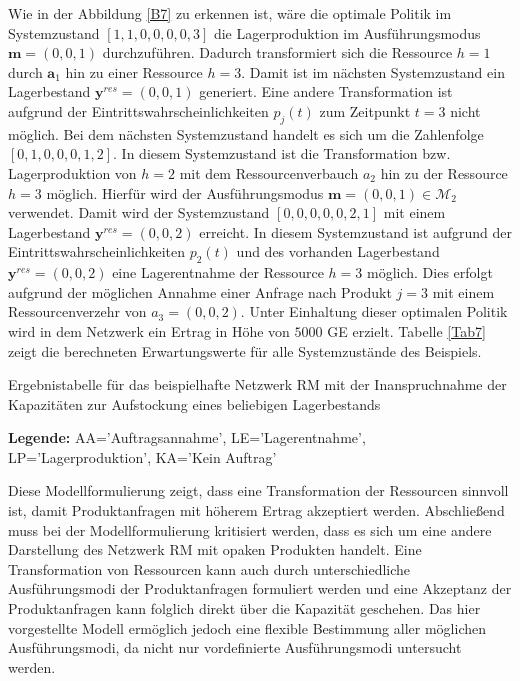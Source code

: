 Wie in der Abbildung \ref{B7} zu erkennen ist, wäre die optimale Politik im Systemzustand $[1,1,0,0,0,0,3]$ die Lagerproduktion im Ausführungsmodus $\textbf{m}=(0,0,1)$ durchzuführen. Dadurch transformiert sich die Ressource $h=1$ durch $\textbf{a}_{1}$ hin zu einer Ressource $h=3$. Damit ist im nächsten Systemzustand ein Lagerbestand $\textbf{y}^{res}=(0,0,1)$ generiert. Eine andere Transformation ist aufgrund der Eintrittswahrscheinlichkeiten $p_{j}(t)$ zum Zeitpunkt $t=3$ nicht möglich. Bei dem nächsten Systemzustand handelt es sich um die Zahlenfolge $[0,1,0,0,0,1,2]$. In diesem Systemzustand ist die Transformation bzw. Lagerproduktion von $h=2$ mit dem Ressourcenverbauch $a_{2}$ hin zu der Ressource $h=3$ möglich. Hierfür wird der Ausführungsmodus $\textbf{m}=(0,0,1)\in\mathcal{M}_2$ verwendet. Damit wird der Systemzustand $[0,0,0,0,0,2,1]$ mit einem Lagerbestand $\textbf{y}^{res}=(0,0,2)$ erreicht. In diesem Systemzustand ist aufgrund der Eintrittswahrscheinlichkeiten $p_2(t)$ und des vorhanden Lagerbestand $\textbf{y}^{res}=(0,0,2)$ eine Lagerentnahme der Ressource $h=3$ möglich. Dies erfolgt aufgrund der möglichen Annahme einer Anfrage nach Produkt $j=3$ mit einem Ressourcenverzehr von $a_{3}=(0,0,2)$. Unter Einhaltung dieser optimalen Politik wird in dem Netzwerk ein Ertrag in Höhe von $5000$ GE erzielt. Tabelle \ref{Tab7} zeigt die berechneten Erwartungswerte für alle Systemzustände des Beispiels. 

\begin{table}
\begin{footnotesize}
    \caption{Ergebnistabelle für das beispielhafte Netzwerk RM mit der Inanspruchnahme der Kapazitäten zur Aufstockung eines beliebigen Lagerbestands} \label{Tab7}
    \vspace*{3mm}
    \begin{center}
      {\footnotesize \textbf{Legende:} AA='Auftragsannahme', LE='Lagerentnahme', LP='Lagerproduktion', KA='Kein Auftrag'} 
      \end{center}
\end{footnotesize}
\end{table}

Diese Modellformulierung zeigt, dass eine Transformation der Ressourcen sinnvoll ist, damit Produktanfragen mit höherem Ertrag akzeptiert werden. Abschließend muss bei der Modellformulierung kritisiert werden, dass es sich um eine andere Darstellung des Netzwerk RM mit opaken Produkten handelt. Eine Transformation von Ressourcen kann auch durch unterschiedliche Ausführungsmodi der Produktanfragen formuliert werden und eine Akzeptanz der Produktanfragen kann folglich direkt über die Kapazität geschehen. Das hier vorgestellte Modell ermöglich jedoch eine flexible Bestimmung aller möglichen Ausführungsmodi, da nicht nur vordefinierte Ausführungsmodi untersucht werden.

